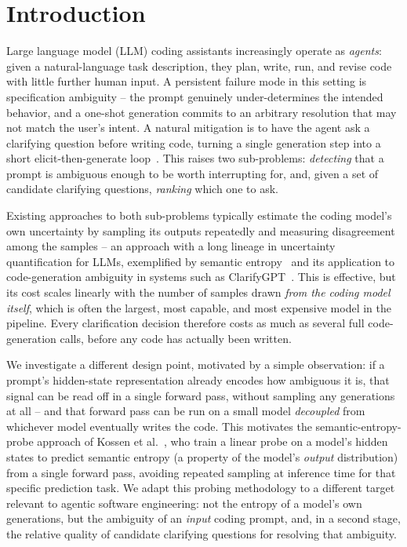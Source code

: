 \section{Introduction}
\label{sec:intro}

Large language model (LLM) coding assistants increasingly operate as
\emph{agents}: given a natural-language task description, they plan, write,
run, and revise code with little further human input. A persistent failure
mode in this setting is specification ambiguity -- the prompt genuinely
under-determines the intended behavior, and a one-shot generation commits to
an arbitrary resolution that may not match the user's intent. A natural
mitigation is to have the agent ask a clarifying question before writing
code, turning a single generation step into a short elicit-then-generate
loop~\cite{clarifygpt}. This raises two sub-problems: \emph{detecting} that
a prompt is ambiguous enough to be worth interrupting for, and, given a set
of candidate clarifying questions, \emph{ranking} which one to ask.

Existing approaches to both sub-problems typically estimate the coding
model's own uncertainty by sampling its outputs repeatedly and measuring
disagreement among the samples -- an approach with a long lineage in
uncertainty quantification for LLMs, exemplified by semantic
entropy~\cite{kuhn2023semantic} and its application to code-generation
ambiguity in systems such as ClarifyGPT~\cite{clarifygpt}. This is
effective, but its cost scales linearly with the number of samples drawn
\emph{from the coding model itself}, which is often the largest, most
capable, and most expensive model in the pipeline. Every clarification
decision therefore costs as much as several full code-generation calls,
before any code has actually been written.

We investigate a different design point, motivated by a simple observation:
if a prompt's hidden-state representation already encodes how ambiguous it
is, that signal can be read off in a single forward pass, without sampling
any generations at all -- and that forward pass can be run on a small model
\emph{decoupled} from whichever model eventually writes the code. This
motivates the semantic-entropy-probe approach of Kossen et
al.~\cite{oatml_sep}, who train a linear probe on a model's hidden states to
predict semantic entropy (a property of the model's \emph{output}
distribution) from a single forward pass, avoiding repeated sampling at
inference time for that specific prediction task. We adapt this probing
methodology to a different target relevant to agentic software engineering:
not the entropy of a model's own generations, but the ambiguity of an
\emph{input} coding prompt, and, in a second stage, the relative quality of
candidate clarifying questions for resolving that ambiguity.


